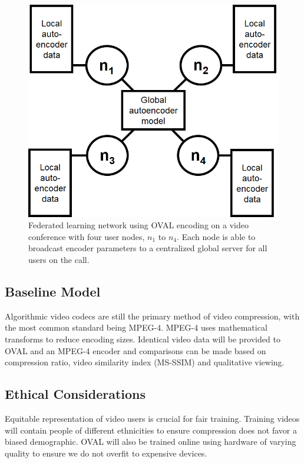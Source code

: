 \documentclass[letter, 12pt]{article}
\begin{document}
\begin{figure}[h!] %
\centering
\includegraphics[width=12cm]{federated.png}
\caption{Federated learning network using OVAL encoding on a video conference with four user nodes, $n_1$ to $n_4$. Each node is able to broadcast encoder parameters to a centralized global server for all users on the call.}
\label{fig:fed}
\end{figure}


\subsection{Baseline Model}

Algorithmic video codecs are still the primary method of video compression, with the most common standard being MPEG-4. MPEG-4 uses mathematical transforms to reduce encoding sizes. Identical video data will be provided to OVAL and an MPEG-4 encoder and comparisons can be made based on compression ratio, video similarity index (MS-SSIM) and qualitative viewing. 

\subsection{Ethical Considerations}

Equitable representation of video users is crucial for fair training. Training videos will contain people of different ethnicities to ensure compression does not favor a biased demographic. OVAL will also be trained online using hardware of varying quality to ensure we do not overfit to expensive devices. 
 
\end{document}
